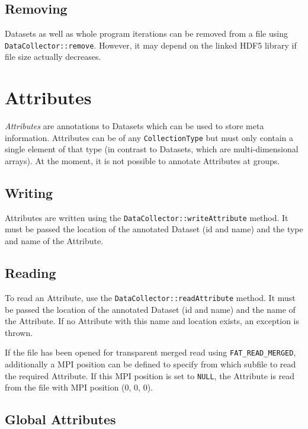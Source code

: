 \documentclass[a4paper,10pt,BCOR12mm]{report}
\begin{document}
\subsection{Removing}

Datasets as well as whole program iterations can be removed from a file using\\ \texttt{DataCollector::remove}.
However, it may depend on the linked HDF5 library if file size actually decreases.


\section{Attributes}

\emph{Attributes} are annotations to Datasets which can be used to store meta information.
Attributes can be of any \texttt{CollectionType} but must only contain a single element
of that type (in contrast to Datasets, which are multi-dimensional arrays).
At the moment, it is not possible to annotate Attributes at groups.

\subsection{Writing}

Attributes are written using the \texttt{DataCollector::writeAttribute} method.
It must be passed the location of the annotated Dataset (id and name) and the type and
name of the Attribute.

\subsection{Reading}

To read an Attribute, use the \texttt{DataCollector::readAttribute} method.
It must be passed the location of the annotated Dataset (id and name) and the
name of the Attribute. If no Attribute with this name and location exists, an
exception is thrown.

If the file has been opened for transparent merged read using \texttt{FAT\_READ\_MERGED},
additionally a MPI position can be defined to specify from which subfile to read
the required Attribute.
If this MPI position is set to \texttt{NULL}, the Attribute is read from the file with
MPI position (0, 0, 0).

\subsection{Global Attributes}
\end{document}
